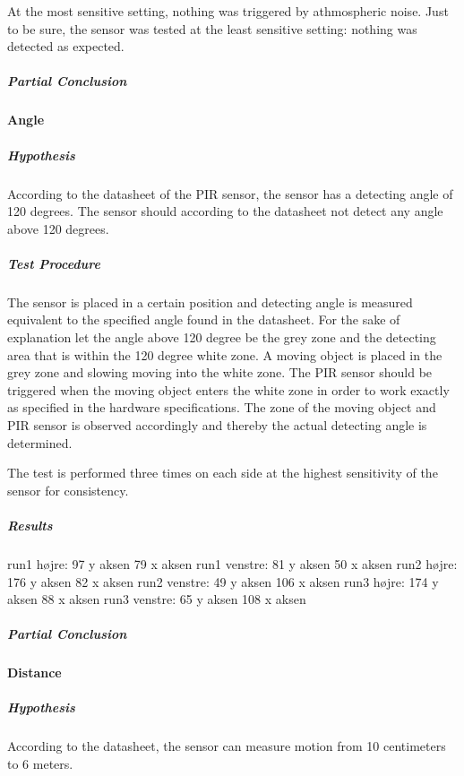 At the most sensitive setting, nothing was triggered by athmospheric noise. Just
to be sure, the sensor was tested at the least sensitive setting: nothing was
detected as expected.

\subparagraph{Partial Conclusion}
\label{subp:SenPartial Conclusion}


\paragraph{Angle}
\label{par:Angle}

\subparagraph{Hypothesis}
\label{subp:AngHypothesis}
According to the datasheet of the PIR sensor,
the sensor has a detecting angle of 120 degrees.
The sensor should according to the datasheet not detect any angle above 120 degrees.

\subparagraph{Test Procedure}
\label{subp:AngTest Procedure}
The sensor is placed in a certain position and detecting angle is measured equivalent to
the specified angle found in the datasheet.
For the sake of explanation let the angle above 120 degree be the grey zone and
the detecting area that is within the 120 degree white zone.
A moving object is placed in the grey zone and slowing moving into the white zone.
The PIR sensor should be triggered when the moving object enters the white zone in order
to work exactly as specified in the hardware specifications.
The zone of the moving object and PIR sensor is observed accordingly
and thereby the actual detecting angle is determined.

The test is performed three times on each side at the highest sensitivity of the sensor for consistency.

\subparagraph{Results}
\label{subp:AngResults}

run1 højre:
      97 y aksen
      79 x aksen
run1 venstre:
      81 y aksen
      50 x aksen
run2 højre:
      176 y aksen
      82 x aksen
run2 venstre:
      49 y aksen
      106 x aksen
run3 højre:
      174 y aksen
      88 x aksen
run3 venstre:
      65 y aksen
      108 x aksen


\subparagraph{Partial Conclusion}
\label{subp:AngPartial Conclusion}

\paragraph{Distance}

\subparagraph{Hypothesis}

According to the datasheet, the sensor can measure motion from 10 centimeters to
6 meters.

